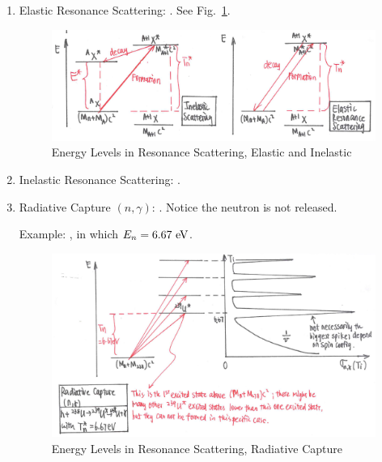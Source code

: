 \documentclass{school-22.101-notes}
\begin{document}
\begin{enumerate}
\item Elastic Resonance Scattering: . See Fig.~\ref{compound-formation-scattering-energy}. 
  \begin{figure}
    \centering
    \includegraphics[width=6in]{images/ni/compound-formation-scattering-energy.png}
    \caption{Energy Levels in Resonance Scattering, Elastic and Inelastic\label{compound-formation-scattering-energy}}
  \end{figure}

\item Inelastic Resonance Scattering: .

\item Radiative Capture $(n, \gamma)$: 
  . Notice the neutron is not released.

  Example: , in which $E_n = 6.67 \mbox{ } \mathrm{eV}$.
  \begin{figure}
    \centering
    \includegraphics[width=6in]{images/ni/compound-formation-rc-energy.png}
    \caption{Energy Levels in Resonance Scattering, Radiative Capture\label{compound-formation-rc-energy}}
  \end{figure}


\end{enumerate}
\end{document}
